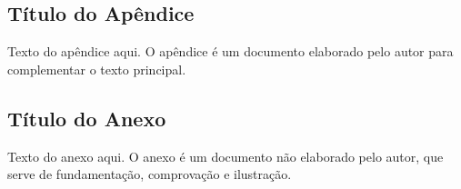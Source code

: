
\begin{apendicesenv}
\partapendices

\section{Título do Apêndice}
Texto do apêndice aqui. O apêndice é um documento elaborado pelo autor para complementar o texto principal.

\end{apendicesenv}

\begin{anexosenv}
\partanexos

\section{Título do Anexo}
Texto do anexo aqui. O anexo é um documento não elaborado pelo autor, que serve de fundamentação, comprovação e ilustração.

\end{anexosenv}
